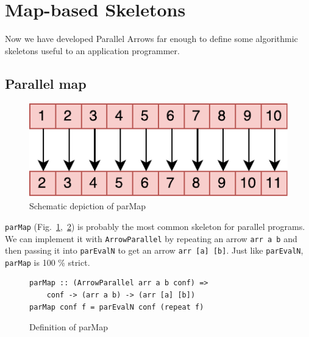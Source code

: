\documentclass{jfp1}
\newcommand{\inlinecode}[1]{\texttt{#1}}
\begin{document}
\FloatBarrier
\section{Map-based Skeletons}
\label{sec:map-skeletons}
Now we have developed Parallel Arrows far enough to define some algorithmic skeletons useful to an application programmer.
\subsection{Parallel map}
\begin{figure}[h]
	\includegraphics[scale=0.7]{images/parMap}
	\caption{Schematic depiction of parMap}
	\label{fig:parMapImg}
\end{figure}
\inlinecode{parMap} (Fig.~\ref{fig:parMapImg},~\ref{fig:parMap}) is probably the most common skeleton for parallel programs. We can implement it with \inlinecode{ArrowParallel} by repeating an arrow \inlinecode{arr a b} and then passing it into \inlinecode{parEvalN} to get an arrow \inlinecode{arr [a] [b]}.
Just like \inlinecode{parEvalN}, \inlinecode{parMap} is 100 \% strict.
\begin{figure}[h]
\begin{lstlisting}[frame=htrbl]
parMap :: (ArrowParallel arr a b conf) =>
	conf -> (arr a b) -> (arr [a] [b])
parMap conf f = parEvalN conf (repeat f)
\end{lstlisting}
\caption{Definition of parMap}
\label{fig:parMap}
\end{figure}
\end{document}
